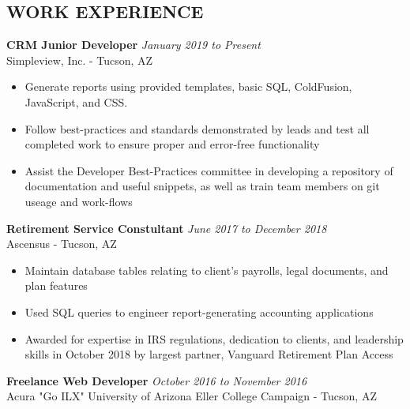 \documentclass[10pt]{res} %
\begin{document}
 
 
\address{Tucson, AZ $|$ xmclallen@gmail.com $|$ (910) 916-0948}        
         
                        
\begin{resume}                         

\section{WORK EXPERIENCE}
\vspace{4pt}
  {\bf CRM Junior Developer} \hfill  {\sl January 2019 to Present}\\
  Simpleview, Inc. - Tucson, AZ
  
   \begin{itemize} %
   \item Generate reports using provided templates, basic SQL, ColdFusion, JavaScript, and CSS.
   \item Follow best-practices and standards demonstrated by leads and test all completed work to ensure proper and error-free functionality
   \item Assist the Developer Best-Practices committee in developing a repository of documentation and useful snippets, as well as train team members on git useage and work-flows
   \end{itemize}


  {\bf Retirement Service Constultant} \hfill  {\sl June 2017 to December 2018}\\
  Ascensus - Tucson, AZ
  
   \begin{itemize} %
   \item Maintain database tables relating to client’s payrolls, legal documents, and plan features
   \item Used SQL queries to engineer report-generating accounting applications
   \item Awarded for expertise in IRS regulations, dedication to clients, and leadership skills in October 2018 by largest partner, Vanguard Retirement Plan Access
   \end{itemize}


  {\bf Freelance Web Developer} \hfill  {\sl October 2016 to November 2016}\\
  Acura "Go ILX" University of Arizona Eller College Campaign - Tucson, AZ
  

\end{resume}
\end{document}
